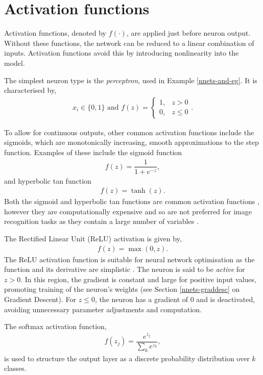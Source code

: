 \section{Activation functions}\label{nnets-act}

Activation functions, denoted by $f(\cdot)$, are applied just before neuron output. Without these functions, the network can be reduced to a linear combination of inputs. Activation functions avoid this by introducing nonlinearity into the model.

The simplest neuron type is the \textit{perceptron}, used in Example \ref{nnets-and-eg}. It is characterised by,
\begin{align}
	x_i \in \{0,1\} \text{ and } f(z) = \begin{cases}
		1, & z > 0 \\
		0, & z \le 0
	\end{cases}.
\end{align}

To allow for continuous outputs, other common activation functions include the sigmoids, which are monotonically increasing, smooth approximations to the step function. Examples of these include the sigmoid function
\begin{align}
	f(z) = \dfrac{1}{1+e^{-z}},
\end{align}
and hyperbolic tan function
\begin{align}
	f(z) = \tanh(z).
\end{align}
Both the sigmoid and hyperbolic tan functions are common activation functions \citep{Goodfellow-et-al-2016}, however they are computationally expensive and so are not preferred for image recognition tasks as they contain a large number of variables \citep{LeCun2012, Nielson2015}.

The Rectified Linear Unit (ReLU) activation \citep{Maas2013} is given by,
\begin{align}
	f(z) = \max(0, z).
\end{align}
The ReLU activation function is suitable for neural network optimisation as the function and its derivative are simplistic \citep{Goodfellow-et-al-2016}. The neuron is said to be \textit{active} for $z > 0$. In this region, the gradient is constant and large for positive input values, promoting training of the neuron's weights (see Section \ref{nnets-graddesc} on Gradient Descent). For $z \leq 0$, the neuron has a gradient of 0 and is deactivated, avoiding unnecessary parameter adjustments and computation. 

The softmax activation function,
\begin{align}
	f(z_j) = \dfrac{e^{z_j}}{\sum_ke^{z_k}},
\end{align}
is used to structure the output layer as a discrete probability distribution over $k$ classes.


